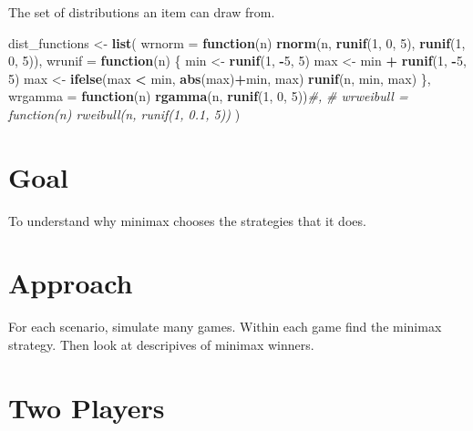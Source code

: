 \documentclass[]{article}
\newenvironment{Shaded}{\begin{snugshade}}{\end{snugshade}}
\newcommand{\KeywordTok}[1]{\textcolor[rgb]{0.13,0.29,0.53}{\textbf{#1}}}
\newcommand{\DataTypeTok}[1]{\textcolor[rgb]{0.13,0.29,0.53}{#1}}
\newcommand{\DecValTok}[1]{\textcolor[rgb]{0.00,0.00,0.81}{#1}}
\newcommand{\StringTok}[1]{\textcolor[rgb]{0.31,0.60,0.02}{#1}}
\newcommand{\CommentTok}[1]{\textcolor[rgb]{0.56,0.35,0.01}{\textit{#1}}}
\newcommand{\ControlFlowTok}[1]{\textcolor[rgb]{0.13,0.29,0.53}{\textbf{#1}}}
\newcommand{\OperatorTok}[1]{\textcolor[rgb]{0.81,0.36,0.00}{\textbf{#1}}}
\newcommand{\NormalTok}[1]{#1}
\begin{document}
The set of distributions an item can draw from.

\begin{Shaded}
\begin{Highlighting}[]
\NormalTok{dist_functions <-}\StringTok{ }\KeywordTok{list}\NormalTok{(}
  \DataTypeTok{wrnorm =} \ControlFlowTok{function}\NormalTok{(n) }\KeywordTok{rnorm}\NormalTok{(n, }\KeywordTok{runif}\NormalTok{(}\DecValTok{1}\NormalTok{, }\DecValTok{0}\NormalTok{, }\DecValTok{5}\NormalTok{), }\KeywordTok{runif}\NormalTok{(}\DecValTok{1}\NormalTok{, }\DecValTok{0}\NormalTok{, }\DecValTok{5}\NormalTok{)),}
  \DataTypeTok{wrunif =} \ControlFlowTok{function}\NormalTok{(n) \{}
\NormalTok{    min <-}\StringTok{ }\KeywordTok{runif}\NormalTok{(}\DecValTok{1}\NormalTok{, }\OperatorTok{-}\DecValTok{5}\NormalTok{, }\DecValTok{5}\NormalTok{)}
\NormalTok{    max <-}\StringTok{ }\NormalTok{min }\OperatorTok{+}\StringTok{ }\KeywordTok{runif}\NormalTok{(}\DecValTok{1}\NormalTok{, }\OperatorTok{-}\DecValTok{5}\NormalTok{, }\DecValTok{5}\NormalTok{)}
\NormalTok{    max <-}\StringTok{ }\KeywordTok{ifelse}\NormalTok{(max }\OperatorTok{<}\StringTok{ }\NormalTok{min, }\KeywordTok{abs}\NormalTok{(max)}\OperatorTok{+}\NormalTok{min, max)}
    \KeywordTok{runif}\NormalTok{(n, min, max)}
\NormalTok{  \},}
  \DataTypeTok{wrgamma =} \ControlFlowTok{function}\NormalTok{(n) }\KeywordTok{rgamma}\NormalTok{(n, }\KeywordTok{runif}\NormalTok{(}\DecValTok{1}\NormalTok{, }\DecValTok{0}\NormalTok{, }\DecValTok{5}\NormalTok{))}\CommentTok{#,}
  \CommentTok{# wrweibull = function(n) rweibull(n, runif(1, 0.1, 5))}
\NormalTok{)}
\end{Highlighting}
\end{Shaded}

\section{Goal}\label{goal}

To understand why minimax chooses the strategies that it does.

\section{Approach}\label{approach}

For each scenario, simulate many games. Within each game find the
minimax strategy. Then look at descripives of minimax winners.

\section{Two Players}\label{two-players}
\end{document}
